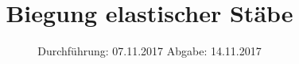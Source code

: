 
\subject{VERSUCH 103}
\title{Biegung elastischer Stäbe}
\date{%
  \hspace{-2.5em}
  Durchführung: 07.11.2017
  \hspace{4em}
  Abgabe: 14.11.2017
}


  \setlength{\parindent}{0em}
  \maketitle
  \thispagestyle{empty}
  \newpage
  \tableofcontents
  \newpage

  
  
  
  
\newpage
\printbibliography{}


